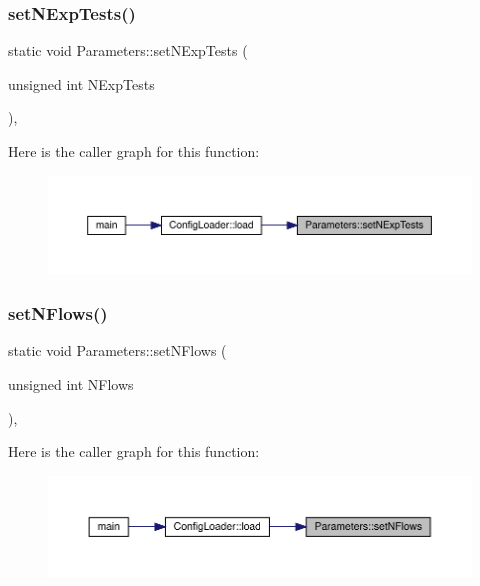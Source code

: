 \subsubsection{\texorpdfstring{setNExpTests()}{setNExpTests()}}
{\footnotesize\ttfamily static void Parameters\+::set\+N\+Exp\+Tests (\begin{DoxyParamCaption}\item[{unsigned int}]{N\+Exp\+Tests }\end{DoxyParamCaption})\hspace{0.3cm}{\ttfamily [inline]}, {\ttfamily [static]}}

Here is the caller graph for this function\+:
\nopagebreak
\begin{figure}[H]
\begin{center}
\leavevmode
\includegraphics[width=350pt]{class_parameters_a5cbf802e3e5db24cf0b8afc3f39f0830_icgraph}
\end{center}
\end{figure}
\mbox{\label{class_parameters_ae9bb965e9bfa37365c5b5ef83e95f97d}} 
\subsubsection{\texorpdfstring{setNFlows()}{setNFlows()}}
{\footnotesize\ttfamily static void Parameters\+::set\+N\+Flows (\begin{DoxyParamCaption}\item[{unsigned int}]{N\+Flows }\end{DoxyParamCaption})\hspace{0.3cm}{\ttfamily [inline]}, {\ttfamily [static]}}

Here is the caller graph for this function\+:
\nopagebreak
\begin{figure}[H]
\begin{center}
\leavevmode
\includegraphics[width=350pt]{class_parameters_ae9bb965e9bfa37365c5b5ef83e95f97d_icgraph}
\end{center}
\end{figure}
\mbox{\label{class_parameters_a24bd9c86cda80898bc65b950983b6a17}} 
